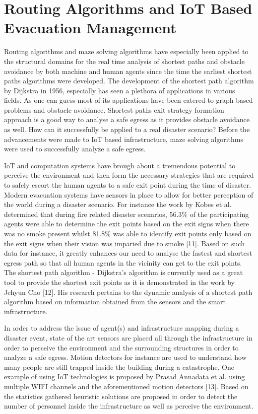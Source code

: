 \section{Routing Algorithms and IoT Based Evacuation Management}
\label{sec:pastwork:Routing Algorithms and IoT Based Evacuation Management}

Routing algorithms and maze solving algorithms have especially been applied to the structural domains for the real time analysis of shortest paths and obstacle avoidance by both machine and human agents since the time the earliest shortest paths algorithms were developed. The development of the shortest path algorithm by Dijkstra in 1956, especially has seen a plethora of applications in various fields. As one can guess most of its applications have been catered to graph based problems and obstacle avoidance. Shortest paths exit strategy formation approach is a good way to analyse a safe egress as it provides obstacle avoidance as well. How can it successfully be applied to a real disaster scenario? Before the advancements were made to IoT based infrastructure, maze solving algorithms were used to successfully analyze a safe egress. 

IoT and computation systems have brough about a tremendous potential to perceive the environment and then form the necessary strategies that are required to safely escort the human agents to a safe exit point during the time of disaster. Modern evacuation systems have sensors in place to allow for better perception of the world during a disaster scenario. For instance the work by Kobes et al. determined that during fire related disaster scenarios, 56.3\% of the participating agents were able to determine the exit points based on the exit signs when there was no smoke present whilst 81.8\% was able to identify exit points only based on the exit signs when their vision was imparied due to smoke [11]. Based on such data for instance, it greatly enhances our need to analyse the fastest and shortest egress path so that all human agents in the vicinity can get to the exit points. The shortest path algorithm - Dijkstra's algorithm is currently used as a great tool to provide the shortest exit points as it is demonstrated in the work by Jehyun Cho [12]. His research pertains to the dynamic analysis of a shortest path algorithm based on information obtained from the sensors and the smart infrastructure.  

In order to address the issue of agent(s) and infrastructure mapping during a disaster event, state of the art sensors are placed all through the infrastructure in order to perceive the environment and the surrounding structures in order to analyze a safe egress. Motion detectors for instance are used to understand how many people are still trapped inside the building during a catastrophe. One example of using IoT technologies is proposed by Prasad Annadata et al. using multiple WIFI channels and the aforementioned motion detectors [13]. Based on the statistics gathered heuristic solutions are proposed in order to detect the number of personnel inside the infrastructure as well as perceive the environment.          

